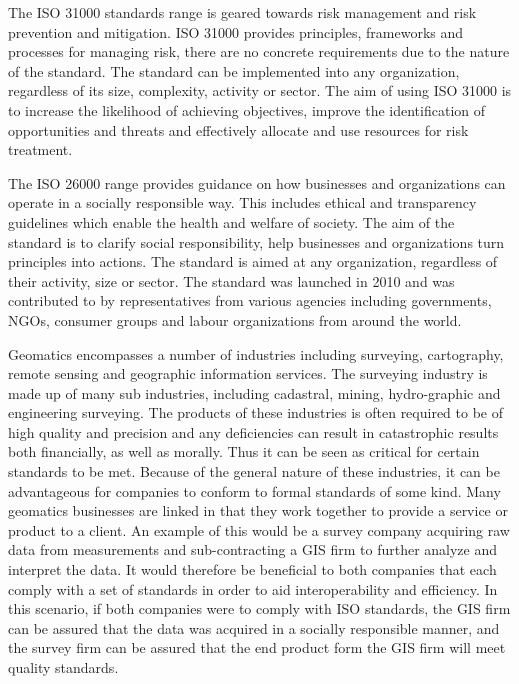 \documentclass[11pt,a4paper]{article}
\begin{document}
\vspace{5mm}

The ISO 31000 standards range is geared towards risk management and risk prevention and mitigation. ISO 31000 provides principles, frameworks and processes for managing risk, there are no concrete requirements due to the nature of the standard. The standard can be implemented into any organization, regardless of its size, complexity, activity or sector. The aim of using ISO 31000 is to increase the likelihood of achieving objectives, improve the identification of opportunities and threats and effectively allocate and use resources for risk treatment. \cite{_iso_????}

\vspace{5mm}

The ISO 26000 range provides guidance on how businesses and organizations can operate in a socially responsible way. This includes ethical and transparency guidelines which enable the health and welfare of society. The aim of the standard is to clarify social responsibility, help businesses and organizations turn principles into actions. The standard is aimed at any organization, regardless of their activity, size or sector. The standard was launched in 2010 and was contributed to by representatives from various agencies including governments, NGOs, consumer groups and labour organizations from around the world. 

\vspace{5mm}

Geomatics encompasses a number of industries including surveying, cartography, remote sensing and geographic information services. The surveying industry is made up of many sub industries, including cadastral, mining, hydro-graphic and engineering surveying. The products of these industries is often required to be of high quality and precision and any deficiencies can result in catastrophic results both financially, as well as morally. Thus it can be seen as critical for certain standards to be met. Because of the general nature of these industries, it can be advantageous for companies to conform to formal standards of some kind. Many geomatics businesses are linked in that they work together to provide a service or product to a client. An example of this would be a survey company acquiring raw data from measurements and sub-contracting a GIS firm to further analyze and interpret the data. It would therefore be beneficial to both companies that each comply with a set of standards in order to aid interoperability and efficiency. In this scenario, if both companies were to comply with ISO standards, the GIS firm can be assured that the data was acquired in a socially responsible manner, and the survey firm can be assured that the end product form the GIS firm will meet quality standards. 
\end{document}
